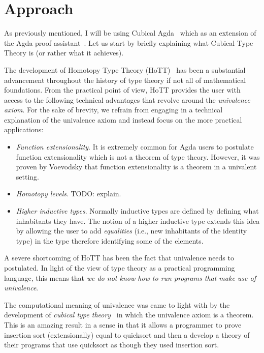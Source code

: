 \documentclass{article}
\begin{document}

\section{Approach}

As previously mentioned, I will be using Cubical Agda~\cite{cubicalagda} which as an
extension of the Agda proof assistant~\cite{norell:2008}. Let us start by briefly
explaining what Cubical Type Theory is (or rather what it achieves).

The development of Homotopy Type Theory (HoTT)~\cite{hottbook} has been a substantial
advancement throughout the history of type theory if not all of mathematical foundations.
From the practical point of view, HoTT provides the user with access to the following
technical advantages that revolve around the \emph{univalence axiom}. For the sake of
brevity, we refrain from engaging in a technical explanation of the univalence axiom and
instead focus on the more practical applications:

\begin{itemize}
  \item \emph{Function extensionality}. It is extremely common for Agda users to postulate
    function extensionality which is not a theorem of type theory. However, it was proven
    by Voevodsky that function extensionality is a theorem in a univalent setting.
  \item \emph{Homotopy levels}. TODO: explain.
  \item \emph{Higher inductive types}. Normally inductive types are defined by defining
    what inhabitants they have. The notion of a higher inductive type extends this idea by
    allowing the user to add \emph{equalities} (i.e., new inhabitants of the identity
    type) in the type therefore identifying some of the elements.
\end{itemize}

A severe shortcoming of HoTT has been the fact that univalence needs to postulated. In
light of the view of type theory as a practical programming language, this means that
\emph{we do not know how to run programs that make use of univalence}.

The computational meaning of univalence was came to light with by the development of
\emph{cubical type theory}~\cite{cubicaltt} in which the univalence axiom is a theorem.
This is an amazing result in a sense in that it allows a programmer to prove insertion
sort (extensionally) equal to quicksort and then a develop a theory of their programs that
use quicksort as though they used insertion sort.



\end{document}
